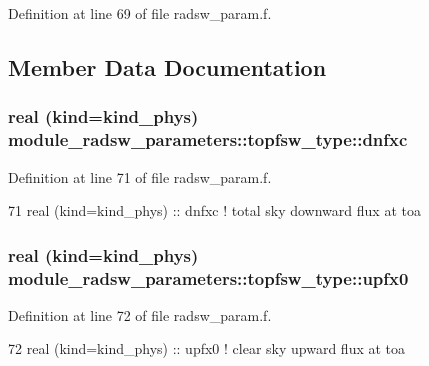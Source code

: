 Definition at line 69 of file radsw\+\_\+param.\+f.



\subsection{Member Data Documentation}
\subsubsection[{\texorpdfstring{dnfxc}{dnfxc}}]{\setlength{\rightskip}{0pt plus 5cm}real (kind=kind\+\_\+phys) module\+\_\+radsw\+\_\+parameters\+::topfsw\+\_\+type\+::dnfxc}\hypertarget{structmodule__radsw__parameters_1_1topfsw__type_ac1466bb6a9da92a59bdef51439320f35}{}\label{structmodule__radsw__parameters_1_1topfsw__type_ac1466bb6a9da92a59bdef51439320f35}


Definition at line 71 of file radsw\+\_\+param.\+f.


\begin{DoxyCode}
71         \textcolor{keywordtype}{real (kind=kind\_phys)} :: dnfxc         \textcolor{comment}{! total sky downward flux at toa}
\end{DoxyCode}
\subsubsection[{\texorpdfstring{upfx0}{upfx0}}]{\setlength{\rightskip}{0pt plus 5cm}real (kind=kind\+\_\+phys) module\+\_\+radsw\+\_\+parameters\+::topfsw\+\_\+type\+::upfx0}\hypertarget{structmodule__radsw__parameters_1_1topfsw__type_a992c82c935dcb4d6269c905fc184cf48}{}\label{structmodule__radsw__parameters_1_1topfsw__type_a992c82c935dcb4d6269c905fc184cf48}


Definition at line 72 of file radsw\+\_\+param.\+f.


\begin{DoxyCode}
72         \textcolor{keywordtype}{real (kind=kind\_phys)} :: upfx0         \textcolor{comment}{! clear sky upward flux at toa}
\end{DoxyCode}
